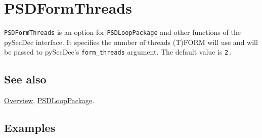 \documentclass[../FeynHelpersManual.tex]{subfiles}
\begin{document}
\hypertarget{psdformthreads}{
\section{PSDFormThreads}\label{psdformthreads}}

\texttt{PSDFormThreads} is an option for \texttt{PSDLoopPackage} and
other functions of the pySecDec interface. It specifies the number of
threads (T)FORM will use and will be passed to pySecDec's
\texttt{form_threads} argument. The default value is \texttt{2.}

\subsection{See also}

\hyperlink{toc}{Overview}, \hyperlink{psdlooppackage}{PSDLoopPackage}.

\subsection{Examples}
\end{document}
